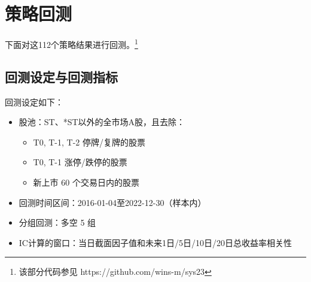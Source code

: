 \documentclass[11pt]{article}
\begin{document}
\section{策略回测} 
下面对这112个策略结果进行回测。\footnote{该部分代码参见 https://github.com/wins-m/sys23}
\subsection{回测设定与回测指标}
回测设定如下：
\begin{itemize}
    \item 股池：ST、*ST以外的全市场A股，且去除：
    \begin{itemize}
        \item T0, T-1, T-2 停牌/复牌的股票
        \item T0, T-1 涨停/跌停的股票
        \item 新上市 60 个交易日内的股票
    \end{itemize}
    \item 回测时间区间：2016-01-04至2022-12-30（样本内）
    \item 分组回测：多空 5 组
    \item IC计算的窗口：当日截面因子值和未来1日/5日/10日/20日总收益率相关性
\end{itemize}
\end{document}
